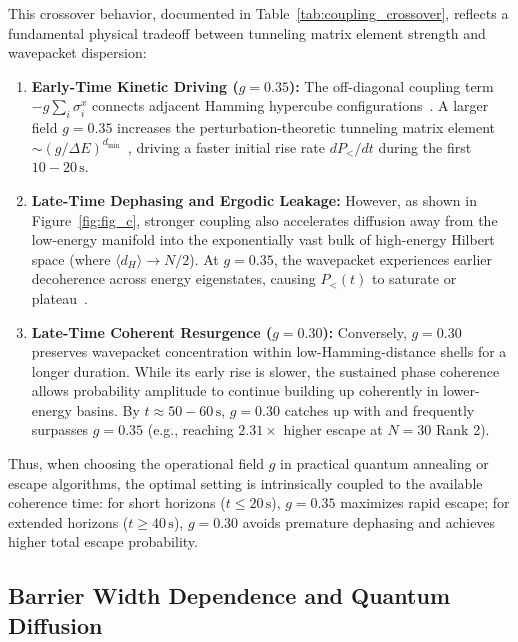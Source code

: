 This crossover behavior, documented in Table~\ref{tab:coupling_crossover}, reflects a fundamental physical tradeoff between tunneling matrix element strength and wavepacket dispersion:
\begin{enumerate}
    \item \textbf{Early-Time Kinetic Driving ($g = 0.35$):} The off-diagonal coupling term $-g \sum_i \sigma_i^x$ connects adjacent Hamming hypercube configurations~\cite{kadowaki1998, santoro2002}. A larger field $g = 0.35$ increases the perturbation-theoretic tunneling matrix element $\sim (g/\Delta E)^{d_{\min}}$~\cite{denchev2016}, driving a faster initial rise rate $dP_</dt$ during the first $10 - 20\,\text{s}$.
    \item \textbf{Late-Time Dephasing and Ergodic Leakage:} However, as shown in Figure~\ref{fig:fig_c}, stronger coupling also accelerates diffusion away from the low-energy manifold into the exponentially vast bulk of high-energy Hilbert space (where $\langle d_H \rangle \to N/2$). At $g = 0.35$, the wavepacket experiences earlier decoherence across energy eigenstates, causing $P_<(t)$ to saturate or plateau~\cite{smelyanskiy2020}.
    \item \textbf{Late-Time Coherent Resurgence ($g = 0.30$):} Conversely, $g = 0.30$ preserves wavepacket concentration within low-Hamming-distance shells for a longer duration. While its early rise is slower, the sustained phase coherence allows probability amplitude to continue building up coherently in lower-energy basins. By $t \approx 50 - 60\,\text{s}$, $g = 0.30$ catches up with and frequently surpasses $g = 0.35$ (e.g., reaching $2.31\times$ higher escape at $N = 30$ Rank 2).
\end{enumerate}

Thus, when choosing the operational field $g$ in practical quantum annealing or escape algorithms, the optimal setting is intrinsically coupled to the available coherence time: for short horizons ($t \le 20\,\text{s}$), $g = 0.35$ maximizes rapid escape; for extended horizons ($t \ge 40\,\text{s}$), $g = 0.30$ avoids premature dephasing and achieves higher total escape probability.

\subsection{Barrier Width Dependence and Quantum Diffusion}
\label{subsec:barrier_and_diffusion}

